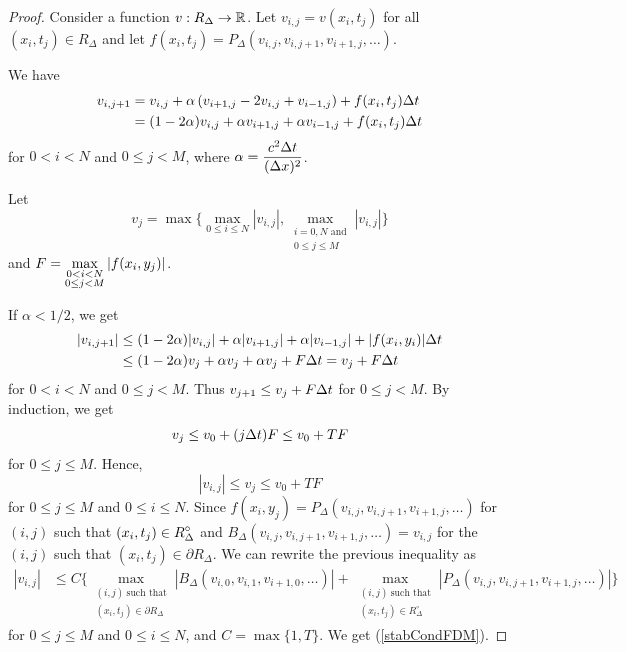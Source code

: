 \begin{proof}
Consider a function $v:R_\Delta \to \mathbb{R}$.  Let $v_{i,j} = v(x_i,t_j)$
for all $(x_i,t_j) \in R_\Delta$ and let
$f(x_i,t_j) = P_\Delta(v_{i,j},v_{i,j+1},v_{i+1,j},\ldots)$.

We have
\begin{align*}
v_{i,j+1} &= v_{i,j} +\alpha \left(v_{i+1,j} - 2v_{i,j} +
  v_{i-1,j}\right) + f(x_i,t_j) \Delta{t} \\
&= (1-2\alpha) v_{i,j} +\alpha v_{i+1,j} + \alpha v_{i-1,j}
+ f(x_i,t_j) \Delta{t}
\end{align*}
for $0<i<N$ and $0\leq j < M$,
where $\displaystyle \alpha = \frac{c^2\Delta{t}}{(\Delta{x})^2}$.

Let
\[
v_j = \max\bigg\{ \max_{0\leq i \leq N} |v_{i,j}|, 
\max_{\substack{i=0,N \text{ and}\\0\leq j \leq M}} |v_{i,j}|
\bigg\}
\]
and
$\displaystyle F = \max_{\substack{0<i<N\\0\leq j<M}} |f(x_i,y_j)|$.

If $\alpha < 1/2$, we get
\begin{align*}
|v_{i,j+1}| &\leq (1-2\alpha) |v_{i,j}| +\alpha |v_{i+1,j}| + \alpha |v_{i-1,j}|
+ |f(x_i,y_i)| \Delta{t} \\
&\leq (1-2\alpha) v_j +\alpha v_j + \alpha v_j + F \Delta{t}
  = v_j + F \Delta{t}
\end{align*}
for $0<i<N$ and $0\leq j < M$.  Thus
$\displaystyle v_{j+1} \leq v_j + F \Delta{t}$ for $0\leq j < M$.
By induction, we get
\[
  v_j \leq v_0 + (j \Delta{t}) F \leq v_0 + T F 
\]
for $0\leq j \leq M$.  Hence,
\[
  |v_{i,j}| \leq v_j \leq v_0 + T F
\]
for $0\leq j \leq M$ and $0\leq i \leq N$.  Since
$f(x_i,y_j) = P_\Delta(v_{i,j},v_{i,j+1},v_{i+1,j},\ldots)$
for $(i,j)$ such that $\displaystyle (x_i,t_j) \in R_\Delta^\circ$
and $B_\Delta(v_{i,j},v_{i,j+1},v_{i+1,j},\ldots) = v_{i,j}$ for the
$(i,j)$ such that $(x_i,t_j) \in \partial R_\Delta$.  We can
rewrite the previous inequality as
\begin{align*}
|v_{i,j}| &\leq C \bigg\{
\max_{\substack{(i,j)\ \text{such that}\\(x_i,t_j) \in \partial R_\Delta}}
|B_\Delta(v_{i,0},v_{i,1},v_{i+1,0},\ldots)|
+ \max_{\substack{(i,j)\ \text{such that}\\(x_i,t_j) \in R_\Delta^\circ}}
|P_\Delta(v_{i,j},v_{i,j+1},v_{i+1,j},\ldots)| \bigg\}
\end{align*}
for $0\leq j \leq M$ and $0\leq i \leq N$, and $C = \max \{1, T\}$.
We get (\ref{stabCondFDM}).
\end{proof}

